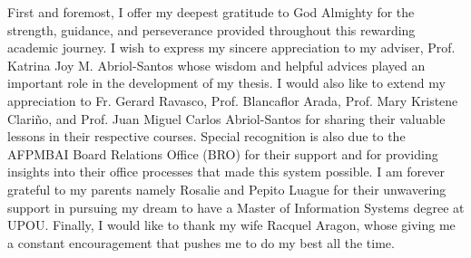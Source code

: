 
\begin{acknowledgement}
   First and foremost, I offer my deepest gratitude to God Almighty for the strength, guidance, and perseverance provided throughout this rewarding academic journey. I wish to express my sincere appreciation to my adviser, Prof. Katrina Joy M. Abriol-Santos whose wisdom and helpful advices played an important role in the development of my thesis. I would also like to extend my appreciation to Fr. Gerard Ravasco, Prof. Blancaflor Arada, Prof. Mary Kristene Clariño, and Prof. Juan Miguel Carlos Abriol-Santos for sharing their valuable lessons in their respective courses. Special recognition is also due to the AFPMBAI Board Relations Office (BRO) for their support and for providing  insights into their office processes that made this system possible. I am forever grateful to my parents namely Rosalie and Pepito Luague for their unwavering support in pursuing my dream to have a Master of Information Systems degree at UPOU. Finally, I would like to thank my wife Racquel Aragon, whose giving me a  constant encouragement that pushes me to do my best all the time.
\end{acknowledgement}